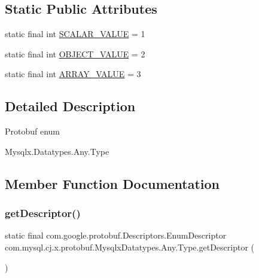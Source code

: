 \subsection*{Static Public Attributes}
\begin{DoxyCompactItemize}
\item 
static final int \mbox{\hyperlink{enumcom_1_1mysql_1_1cj_1_1x_1_1protobuf_1_1_mysqlx_datatypes_1_1_any_1_1_type_a5f32fab5fc3de9186df497c80bc0057b}{S\+C\+A\+L\+A\+R\+\_\+\+V\+A\+L\+UE}} = 1
\item 
static final int \mbox{\hyperlink{enumcom_1_1mysql_1_1cj_1_1x_1_1protobuf_1_1_mysqlx_datatypes_1_1_any_1_1_type_abba143b047a3f183d1e40f8d949ac78d}{O\+B\+J\+E\+C\+T\+\_\+\+V\+A\+L\+UE}} = 2
\item 
static final int \mbox{\hyperlink{enumcom_1_1mysql_1_1cj_1_1x_1_1protobuf_1_1_mysqlx_datatypes_1_1_any_1_1_type_abae573ee6db61e559f2c8d74fb4b58df}{A\+R\+R\+A\+Y\+\_\+\+V\+A\+L\+UE}} = 3
\end{DoxyCompactItemize}


\subsection{Detailed Description}
Protobuf enum
\begin{DoxyCode}
Mysqlx.Datatypes.Any.Type 
\end{DoxyCode}
 

\subsection{Member Function Documentation}
\mbox{\label{enumcom_1_1mysql_1_1cj_1_1x_1_1protobuf_1_1_mysqlx_datatypes_1_1_any_1_1_type_ad5ae1f277b88664ebdb0be538768b8ae}} 
\subsubsection{\texorpdfstring{get\+Descriptor()}{getDescriptor()}}
{\footnotesize\ttfamily static final com.\+google.\+protobuf.\+Descriptors.\+Enum\+Descriptor com.\+mysql.\+cj.\+x.\+protobuf.\+Mysqlx\+Datatypes.\+Any.\+Type.\+get\+Descriptor (\begin{DoxyParamCaption}{ }\end{DoxyParamCaption})\hspace{0.3cm}{\ttfamily [static]}}

